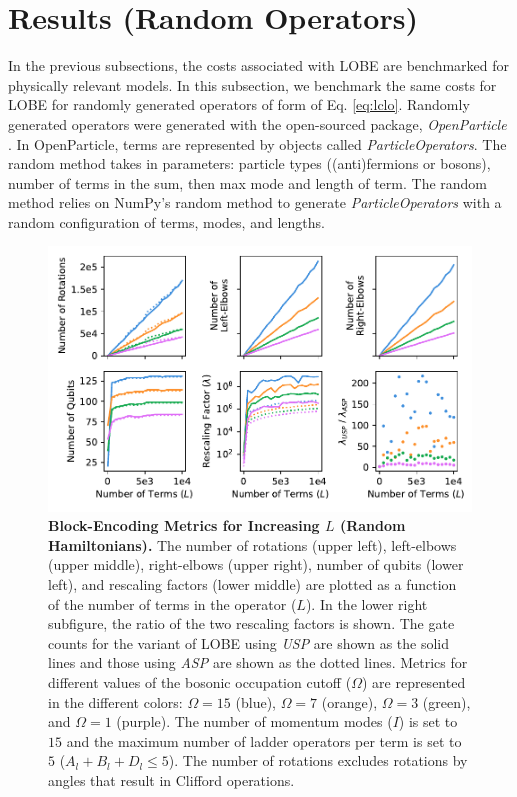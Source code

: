 \section{Results (Random Operators)}
\label{sec:random-op-results}

In the previous subsections, the costs associated with LOBE are benchmarked for physically relevant models.
In this subsection, we benchmark the same costs for LOBE for randomly generated operators of form of Eq. \ref{eq:lclo}.
Randomly generated operators were generated with the open-sourced package, \textit{OpenParticle} \cite{openparticle}. In OpenParticle, terms are represented by objects called \textit{ParticleOperators}. The random method takes in parameters: particle types ((anti)fermions or bosons), number of terms in the sum, then max mode and length of term. 
The random method relies on NumPy's \cite{harris2020array} random method to generate \textit{ParticleOperators} with a random configuration of terms, modes, and lengths. 

\begin{figure}
    \centering
    \includegraphics[width=16cm]{figures/random_hamiltonians_metrics_vs_terms.pdf}
    \caption{
        \textbf{Block-Encoding Metrics for Increasing $L$ (Random Hamiltonians).}
        The number of rotations (upper left), left-elbows (upper middle), right-elbows (upper right), number of qubits (lower left), and rescaling factors (lower middle) are plotted as a function of the number of terms in the operator ($L$).
        In the lower right subfigure, the ratio of the two rescaling factors is shown.
        The gate counts for the variant of LOBE using \textit{USP} are shown as the solid lines and those using \textit{ASP} are shown as the dotted lines.
        Metrics for different values of the bosonic occupation cutoff ($\Omega$) are represented in the different colors: $\Omega = 15$ (blue), $\Omega = 7$ (orange), $\Omega = 3$ (green), and $\Omega = 1$ (purple).
        The number of momentum modes ($I$) is set to $15$ and the maximum number of ladder operators per term is set to $5$ ($A_l + B_l + D_l \leq 5$).
        The number of rotations excludes rotations by angles that result in Clifford operations.
    }
    \label{fig:random_hamiltonians_metrics_vs_terms}
\end{figure}

